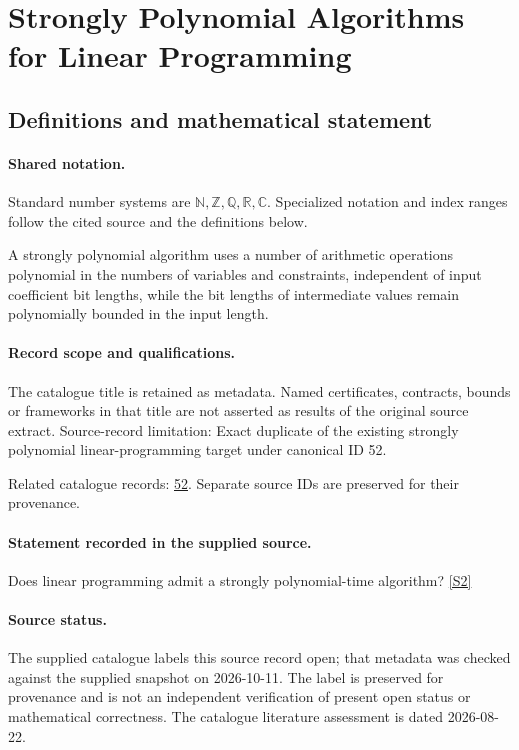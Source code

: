 \documentclass[11pt]{article}
\newcommand{\sref}[2]{\hyperlink{source:#1:#2}{[S#2]}}
\begin{document}
\section{Strongly Polynomial Algorithms for Linear Programming}\label{statement}

\subsection{Definitions and mathematical statement}

\paragraph{Shared notation.}Standard number systems are $\mathbb N,\mathbb Z,\mathbb Q,\mathbb R,\mathbb C$. Specialized notation and index ranges follow the cited source and the definitions below.


A strongly polynomial algorithm uses a number of arithmetic operations polynomial in the numbers of variables and constraints, independent of input coefficient bit lengths, while the bit lengths of intermediate values remain polynomially bounded in the input length.
\paragraph{Record scope and qualifications.}
The catalogue title is retained as metadata. Named certificates, contracts, bounds or frameworks in that title are not asserted as results of the original source extract.
Source-record limitation: Exact duplicate of the existing strongly polynomial linear-programming target under canonical ID 52.

Related catalogue records: \href{https://mehmetmars7.github.io/Erdosproblems-llm-hunter/problem.html?type=open_problems&id=52}{52}. Separate source IDs are preserved for their provenance.
\paragraph{Statement recorded in the supplied source.}
Does linear programming admit a strongly polynomial-time algorithm? \sref{statement}{2}
\paragraph{Source status.}
The supplied catalogue labels this source record open; that metadata was checked against the supplied snapshot on 2026-10-11. The label is preserved for provenance and is not an independent verification of present open status or mathematical correctness. The catalogue literature assessment is dated 2026-08-22.
\end{document}
